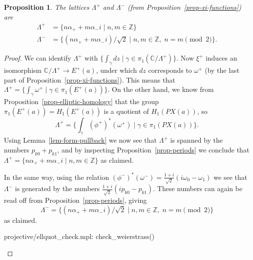 \documentclass[reqno]{amsart}
\newcommand{\Lm}        {\Lambda}
\newcommand{\al}        {\alpha}
\newcommand{\gm}        {\gamma}
\newcommand{\om}        {\omega}
\newcommand{\Z}         {{\mathbb{Z}}}
\newcommand{\C}         {{\mathbb{C}}}
\newcommand{\st}        {\;|\;}
\newcommand{\rt}        {\sqrt{2}}
\renewcommand{\:}{\colon}
\newtheorem{proposition}[theorem]{Proposition}
\theoremstyle{definition}
\begin{document}
\begin{proposition}
 The lattices $\Lm^+$ and $\Lm^-$ (from
 Proposition~\ref{prop-xi-functions}) are
 \begin{align*}
  \Lm^+ &= \{n\al_++m\al_-i \st n,m\in\Z\} \\
  \Lm^- &= \{(n\al_++m\al_-i)/\sqrt{2}\st n,m\in\Z,\; n=m\pmod{2}\}.
 \end{align*}
\end{proposition}
\begin{proof}
 We can identify $\Lm^+$ with
 $\{\int_\gm dz\st\gm\in\pi_1(\C/\Lm^+)\}$.  Now $\xi^+$ induces an
 isomorphism $\C/\Lm^+\to E^+(a)$, under which $dz$ corresponds to
 $\om^+$ (by the last part of Proposition~\ref{prop-xi-functions}).
 This means that $\Lm^+=\{\int_\gm\om^+\st\gm\in\pi_1(E^+(a))\}$.  On
 the other hand, we know from Proposition~\ref{prop-elliptic-homology}
 that the group $\pi_1(E^+(a))=H_1(E^+(a))$ is a quotient of
 $H_1(PX(a))$, so
 \[ \Lm^+=\{\int_\gm(\phi^+)^*(\om^+)\st\gm\in\pi_1(PX(a))\}. \]
 Using Lemma~\ref{lem-form-pullback} we now see that $\Lm^+$ is
 spanned by the numbers $p_{k0}+p_{k1}$, and by inspecting
 Proposition~\ref{prop-periods} we conclude that
 $\Lm^+=\{n\al_++m\al_-i\st n,m\in\Z\}$ as claimed.

 In the same way, using the relation
 $(\phi^-)^*(\om^-)=\frac{1+i}{\rt}(i\om_0-\om_1)$ we see that $\Lm^-$
 is generated by the numbers $\frac{1+i}{\rt}(ip_{k0}-p_{k1})$.  These
 numbers can again be read off from Proposition~\ref{prop-periods},
 giving
 \[ \Lm^- = \{(n\al_++m\al_-i)/\sqrt{2}\st n,m\in\Z,\; n=m\pmod{2}\}
 \]
 as claimed.
 \begin{checks}
  projective/ellquot_check.mpl: check_weierstrass()
 \end{checks}
\end{proof}
\end{document}
